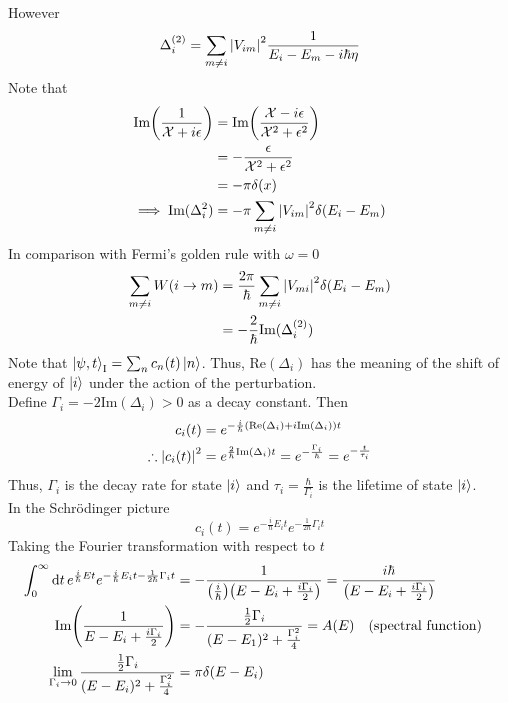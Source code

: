 \documentclass[12pt,a4paper,titlepage]{article}
\newcommand{\trm}[1]{\textrm{#1}} %
\newcommand{\Chi}{\mathcal{X}} %
\renewcommand{\Re}{\trm{Re}} %
\renewcommand{\Im}{\trm{Im}} %
\begin{document}
However
\begin{equation}
\Delta_{i}^{(2)}=\sum_{m\neq i}\abs{V_{im}}^{2}\frac{1}{E_{i}-E_{m}-i\hbar\eta}
\end{equation}
Note that
\begin{equation}
\begin{aligned}
\Im\qty(\frac{1}{\Chi+i\epsilon})&=\Im\qty(\frac{\Chi-i\epsilon}{\Chi^{2}+\epsilon^{2}})\\
&=-\frac{\epsilon}{\Chi^{2}+\epsilon^{2}}\\
&=-\pi\delta(x)\\
\implies \Im(\Delta_{i}^{2})&=-\pi\sum_{m\neq i}\abs{V_{im}}^{2}\delta(E_{i}-E_{m})
\end{aligned}
\end{equation}
In comparison with Fermi's golden rule with $\omega=0$
\begin{equation}
\begin{aligned}
\sum_{m\neq i}W(i\rightarrow m)&=\frac{2\pi}{\hbar}\sum_{m\neq i}\abs{V_{mi}}^{2}\delta(E_{i}-E_{m})\\
&=-\frac{2}{\hbar}\Im(\Delta_{i}^{(2)})
\end{aligned}
\end{equation}
Note that $\ket{\psi,t}_{\trm{I}}=\sum_{n}c_{n}(t)\ket{n}$. Thus, $\Re(\Delta_{i})$ has the meaning of the shift of energy of $\ket{i}$ under the action of the perturbation.\\

Define $\Gamma_{i}=-2\Im(\Delta_{i})>0$ as a decay constant. Then
\begin{equation}
\begin{aligned}
c_{i}(t)&=e^{-\frac{i}{\hbar}\qty(\Re(\Delta_{i})+i\Im(\Delta_{i}))t}\\
\therefore \abs{c_{i}(t)}^{2}&=e^{\frac{2}{\hbar}\Im(\Delta_{i})t}=e^{-\frac{\Gamma_{i}}{\hbar}}=e^{-\frac{t}{\tau_{i}}}
\end{aligned}
\end{equation}
Thus, $\Gamma_{i}$ is the decay rate for state $\ket{i}$ and $\tau_{i}=\frac{\hbar}{\Gamma_{i}}$ is the lifetime of state $\ket{i}$.\\

In the Schr\"{o}dinger picture
\begin{equation}
c_{i}(t)=e^{-\frac{i}{\hbar}E_{i}t}e^{-\frac{1}{2\hbar}\Gamma_{i}t}
\end{equation}
Taking the Fourier transformation with respect to $t$
\begin{equation}
\begin{aligned}
\int_{0}^{\infty}\dd{t}e^{\frac{i}{\hbar}Et}e^{-\frac{i}{\hbar}E_{i}t-\frac{1}{2\hbar}\Gamma_{i}t}&=-\frac{1}{\qty(\frac{i}{\hbar})\qty(E-E_{i}+\frac{i\Gamma_{i}}{2})}=\frac{i\hbar}{\qty(E-E_{i}+\frac{i\Gamma_{i}}{2})}\\
\Im\qty(\frac{1}{E-E_{i}+\frac{i\Gamma_{i}}{2}})&=-\frac{\frac{1}{2}\Gamma_{i}}{(E-E_{1})^{2}+\frac{\Gamma_{i}^{2}}{4}}=A(E)\qq{(spectral function)}\\
\lim_{\Gamma_{i}\rightarrow 0}\frac{\frac{1}{2}\Gamma_{i}}{(E-E_{i})^{2}+\frac{\Gamma_{i}^{2}}{4}}&=\pi\delta(E-E_{i})
\end{aligned}
\end{equation}
\end{document}
